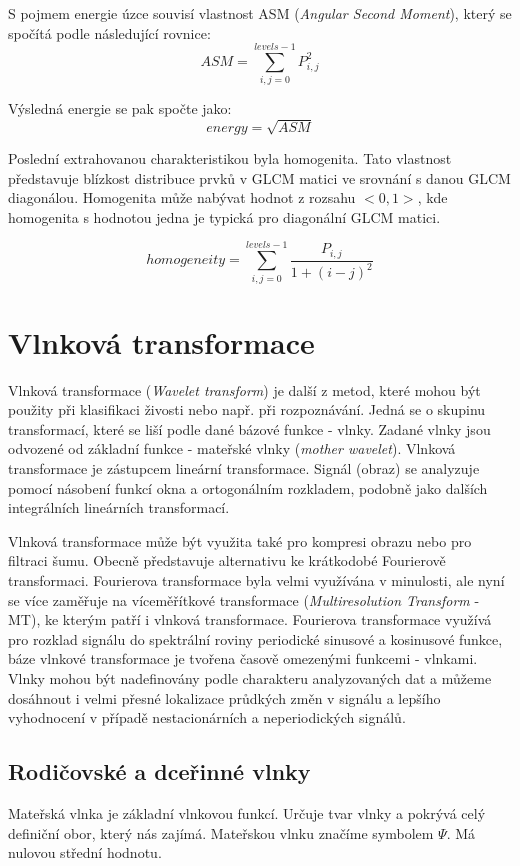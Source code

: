 S pojmem energie úzce souvisí vlastnost ASM (\textit{Angular Second Moment}), který se spočítá podle následující rovnice:\cite{ScikitGLCM}
$$ASM = \sum_{i,j=0}^{levels-1}P_{i,j}^2$$

Výsledná energie se pak spočte jako:\cite{ScikitGLCM}
$$energy = \sqrt{ASM}$$

Poslední extrahovanou charakteristikou byla homogenita. Tato vlastnost představuje blízkost distribuce prvků v GLCM matici ve srovnání s danou GLCM diagonálou. Homogenita může nabývat hodnot z rozsahu $<0, 1>$, kde homogenita s hodnotou jedna je typická pro diagonální GLCM matici.\cite{MatlabGLCM}\cite{ScikitGLCM}

$$homogeneity = \sum_{i,j=0}^{levels-1}\frac{P_{i,j}}{1+(i-j)^2}$$

\section{Vlnková transformace}
Vlnková transformace (\textit{Wavelet transform}) je další z metod, které mohou být použity při klasifikaci živosti nebo např. při rozpoznávání. Jedná se o skupinu transformací, které se liší podle dané bázové funkce - vlnky. Zadané vlnky jsou odvozené od základní funkce - mateřské vlnky (\textit{mother wavelet}). Vlnková transformace je zástupcem lineární transformace. Signál (obraz) se analyzuje pomocí násobení funkcí okna a ortogonálním rozkladem, podobně jako dalších integrálních lineárních transformací. 

Vlnková transformace může být využita také pro kompresi obrazu nebo pro filtraci šumu. \cite{WaveletHlavac} Obecně představuje alternativu ke krátkodobé Fourierově transformaci. Fourierova transformace byla velmi využívána v minulosti, ale nyní se více zaměřuje na víceměřítkové transformace (\textit{Multiresolution Transform} - MT), ke kterým patří i vlnková transformace. Fourierova transformace využívá pro rozklad signálu do spektrální roviny periodické sinusové a kosinusové funkce, báze vlnkové transformace je tvořena časově omezenými funkcemi - vlnkami. Vlnky mohou být nadefinovány podle charakteru analyzovaných dat a můžeme dosáhnout i velmi přesné lokalizace průdkých změn v signálu a lepšího vyhodnocení v případě nestacionárních a neperiodických signálů.\cite{WaveletElektrorevue}

\subsection{Rodičovské a dceřinné vlnky}
Mateřská vlnka je základní vlnkovou funkcí. Určuje tvar vlnky a pokrývá celý definiční obor, který nás zajímá. Mateřskou vlnku značíme symbolem $\Psi$. Má nulovou střední hodnotu.

